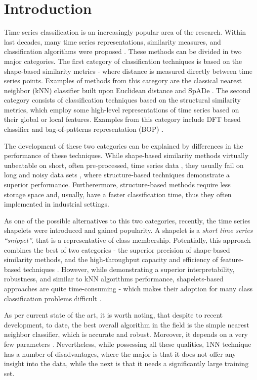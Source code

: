 \documentclass{llncs}
\begin{document}
\section{Introduction}
%
Time series classification is an increasingly popular area of the research. 
Within last decades, many time series representations, similarity measures, 
and classification algorithms were proposed \cite{review}. 
These methods can be divided in two major categories. 
The first category of classification techniques is based on the shape-based 
similarity metrics - where distance is measured directly between time series points. 
Examples of methods from this category are the classical nearest neighbor (kNN)
classifier built upon Euclidean distance \cite{1NN} and SpADe \cite{spade}. 
The second category consists of classification techniques based on the 
structural similarity metrics, which employ some high-level representations 
of time series based on their global or local features. 
Examples from this category include DFT based classifier \cite{DFT}
and bag-of-patterns representation (BOP) \cite{bag_patterns}. 

The development of these two categories can be explained by differences in the 
performance of these techniques. 
While shape-based similarity methods virtually unbeatable on short, 
often pre-processed, time series data \cite{benchmark}, 
they usually fail on long and noisy data sets \cite{indexing},
where structure-based techniques demonstrate a superior performance. 
Furtherermore, structure-based methods require less storage space and, usually, 
have a faster classification time, thus they often implemented in industrial settings. 

As one of the possible alternatives to this two categories, recently, the time series shapelets
were introduced \cite{shapelet} and gained popularity. A shapelet is a \textit{short time 
series ``snippet''}, that is a representative of class membership. Potentially, this 
approach combines the best of two categories - the superior precision of shape-based 
similarity methods, and the high-throughput capacity and efficiency of feature-based 
techniques \cite{logical}. 
However, while demonstrating a superior interpretability, robustness, 
and similar to kNN algorithms performance, shapelets-based approaches are quite time-consuming 
- which makes their adoption for many class classification problems difficult \cite{bagnal}. 

As per current state of the art, it is worth noting, that despite to recent development, to date,
the best overall algorithm in the field is the simple nearest neighbor classifier, which is 
accurate and robust. Moreover, it depends on a very few parameters 
\cite{review, benchmark, comparison, classifiers}. Nevertheless, while possessing all these qualities,
1NN technique has a number of disadvantages, where the major is that it does not offer any 
insight into the data, while the next is that it needs a significantly large training set.
\end{document}

